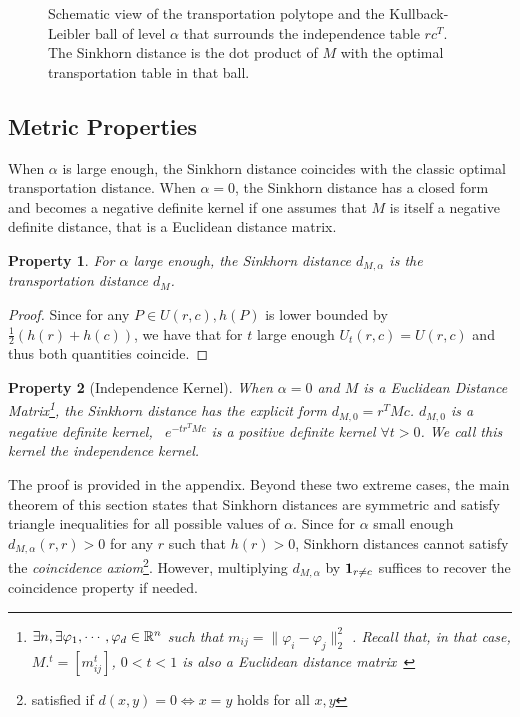 \documentclass{amsart} %
\newtheorem{property}{Property}
\providecommand{\norm}[1]{\lVert#1\rVert}
\begin{document}
\begin{figure}\centering
{\LARGE{}}
\caption{Schematic view of the transportation polytope and the Kullback-Leibler ball of level $\alpha$ that surrounds the independence table $rc^T$. The Sinkhorn distance is the dot product of $M$ with the optimal transportation table in that ball.}\label{fig:jolidessin}
\end{figure}

\subsection{Metric Properties}
When $\alpha$ is large enough, the Sinkhorn distance coincides with the classic optimal transportation distance. When $\alpha=0$, the Sinkhorn distance has a closed form and becomes a negative definite kernel if one assumes that $M$ is itself a negative definite distance, that is a Euclidean distance matrix.


\begin{property}\label{prop:nsd} For $\alpha$ large enough, the Sinkhorn distance $d_{M,\alpha}$ is the transportation distance $d_{M}$.\end{property}
\begin{proof}Since for any $P\in U(r,c), h(P)$ is lower bounded by $\tfrac{1}{2}(h(r)+h(c))$, we have that for $t$ large enough $U_{t}(r,c)= U(r,c)$ and thus both quantities coincide.\end{proof}



\begin{property}[Independence Kernel] When $\alpha=0$ and $M$ is a Euclidean Distance Matrix\footnote{$\exists n, \exists \varphi_1,\cdots,\varphi_d\in\mathbb{R}^n$ such that $m_{ij}=\norm{\varphi_i - \varphi_j}_2^2$ \citep[\S5]{dattorro2005convex}. Recall that, in that case, $M.^t=[m_{ij}^t]$, $0<t<1$ is also a Euclidean distance matrix~\cite[p.78,\S3.2.10]{berg84harmonic} }, the Sinkhorn distance has the explicit form $d_{M,0}=r^T M c$. $d_{M,0}$ is a negative definite kernel, \ie\, $e^{-t r^TMc}$ is a positive definite kernel $\forall t>0$. We call this kernel the independence kernel.\end{property}

The proof is provided in the appendix. Beyond these two extreme cases, the main theorem of this section states that Sinkhorn distances are symmetric and satisfy triangle inequalities for all possible values of $\alpha$. Since for $\alpha$ small enough $d_{M,\alpha}(r,r)>0$ for any $r$ such that $h(r)>0$, Sinkhorn distances cannot satisfy the \emph{coincidence axiom}\footnote{satisfied if $d(x,y)=0\Leftrightarrow x=y$ holds for all $x,y$}. However, multiplying $d_{M,\alpha}$ by $\mathbf 1_{r\ne c}$ suffices to recover the coincidence property if needed.
\end{document}
